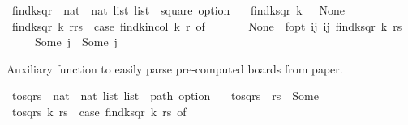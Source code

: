 \begin{isabellebody}
\isanewline
{}\isamarkupfalse%
\ find{\isacharunderscore}{\kern0pt}k{\isacharunderscore}{\kern0pt}sqr\ {\isacharcolon}{\kern0pt}{\isacharcolon}{\kern0pt}\ {\isachardoublequoteopen}nat\ {\isasymRightarrow}\ {\isacharparenleft}{\kern0pt}nat\ list{\isacharparenright}{\kern0pt}\ list\ {\isasymRightarrow}\ square\ option{\isachardoublequoteclose}\ \isanewline
\ \ {\isachardoublequoteopen}find{\isacharunderscore}{\kern0pt}k{\isacharunderscore}{\kern0pt}sqr\ k\ {\isacharbrackleft}{\kern0pt}{\isacharbrackright}{\kern0pt}\ {\isacharequal}{\kern0pt}\ None{\isachardoublequoteclose}\isanewline
{\isacharbar}{\kern0pt}\ {\isachardoublequoteopen}find{\isacharunderscore}{\kern0pt}k{\isacharunderscore}{\kern0pt}sqr\ k\ {\isacharparenleft}{\kern0pt}r{\isacharhash}{\kern0pt}rs{\isacharparenright}{\kern0pt}\ {\isacharequal}{\kern0pt}\ {\isacharparenleft}{\kern0pt}case\ find{\isacharunderscore}{\kern0pt}k{\isacharunderscore}{\kern0pt}in{\isacharunderscore}{\kern0pt}col\ k\ r\ of\ \isanewline
\ \ \ \ \ \ None\ {\isasymRightarrow}\ f{\isacharunderscore}{\kern0pt}opt\ {\isacharparenleft}{\kern0pt}{\isasymlambda}{\isacharparenleft}{\kern0pt}i{\isacharcomma}{\kern0pt}j{\isacharparenright}{\kern0pt}{\isachardot}{\kern0pt}\ {\isacharparenleft}{\kern0pt}i{\isacharplus}{\kern0pt}{}{\isacharcomma}{\kern0pt}j{\isacharparenright}{\kern0pt}{\isacharparenright}{\kern0pt}\ {\isacharparenleft}{\kern0pt}find{\isacharunderscore}{\kern0pt}k{\isacharunderscore}{\kern0pt}sqr\ k\ rs{\isacharparenright}{\kern0pt}\isanewline
\ \ \ \ {\isacharbar}{\kern0pt}\ Some\ j\ {\isasymRightarrow}\ Some\ {\isacharparenleft}{\kern0pt}{}{\isacharcomma}{\kern0pt}j{\isacharparenright}{\kern0pt}{\isacharparenright}{\kern0pt}{\isachardoublequoteclose}%
\begin{isamarkuptext}%
Auxiliary function to easily parse pre-computed boards from paper.%
\end{isamarkuptext}\isamarkuptrue%
\isamarkupfalse%
\ to{\isacharunderscore}{\kern0pt}sqrs\ {\isacharcolon}{\kern0pt}{\isacharcolon}{\kern0pt}\ {\isachardoublequoteopen}nat\ {\isasymRightarrow}\ {\isacharparenleft}{\kern0pt}nat\ list{\isacharparenright}{\kern0pt}\ list\ {\isasymRightarrow}\ path\ option{\isachardoublequoteclose}\ \isanewline
\ \ {\isachardoublequoteopen}to{\isacharunderscore}{\kern0pt}sqrs\ {}\ rs\ {\isacharequal}{\kern0pt}\ Some\ {\isacharbrackleft}{\kern0pt}{\isacharbrackright}{\kern0pt}{\isachardoublequoteclose}\isanewline
{\isacharbar}{\kern0pt}\ {\isachardoublequoteopen}to{\isacharunderscore}{\kern0pt}sqrs\ k\ rs\ {\isacharequal}{\kern0pt}\ {\isacharparenleft}{\kern0pt}case\ find{\isacharunderscore}{\kern0pt}k{\isacharunderscore}{\kern0pt}sqr\ k\ rs\ of\isanewline

\end{isabellebody}
